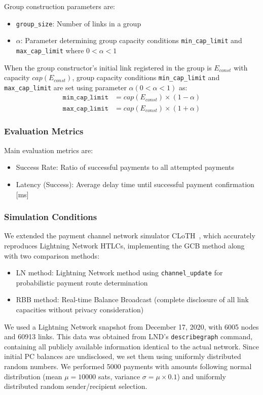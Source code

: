 \documentclass[conference]{IEEEtran}
\newcommand{\channelupdate}{\texttt{channel\_update}}
\newcommand{\groupsize}{\texttt{group\_size}}
\newcommand{\mincaplimit}{\texttt{min\_cap\_limit}}
\newcommand{\maxcaplimit}{\texttt{max\_cap\_limit}}
\begin{document}
Group construction parameters are:
\begin{itemize}
	\item \groupsize{}: Number of links in a group
	\item $\alpha$: Parameter determining group capacity conditions \mincaplimit{} and \maxcaplimit{} where $0 < \alpha < 1$
\end{itemize}

When the group constructor's initial link registered in the group is $E_{const}$ with capacity $cap(E_{const})$, group capacity conditions \mincaplimit{} and \maxcaplimit{} are set using parameter $\alpha (0 < \alpha < 1)$ as:
\begin{align}
	\mincaplimit & = cap(E_{const}) \times (1-\alpha) \\
	\maxcaplimit & = cap(E_{const}) \times (1+\alpha)
\end{align}

\subsubsection{Evaluation Metrics}

Main evaluation metrics are:
\begin{itemize}
	\item Success Rate: Ratio of successful payments to all attempted payments
	\item Latency (Success): Average delay time until successful payment confirmation [ms]
\end{itemize}

\subsubsection{Simulation Conditions}

We extended the payment channel network simulator CLoTH~\cite{CONOSCENTI2021100717}, which accurately reproduces Lightning Network HTLCs, implementing the GCB method along with two comparison methods:
\begin{itemize}
	\item LN method: Lightning Network method using \channelupdate{} for probabilistic payment route determination
	\item RBB method: Real-time Balance Broadcast (complete disclosure of all link capacities without privacy consideration)
\end{itemize}

We used a Lightning Network snapshot from December 17, 2020, with 6005 nodes and 60913 links. This data was obtained from LND's \texttt{describegraph} command, containing all publicly available information identical to the actual network. Since initial PC balances are undisclosed, we set them using uniformly distributed random numbers. We performed 5000 payments with amounts following normal distribution (mean $\mu = 10000$ sats, variance $\sigma = \mu \times 0.1$) and uniformly distributed random sender/recipient selection.
\end{document}
